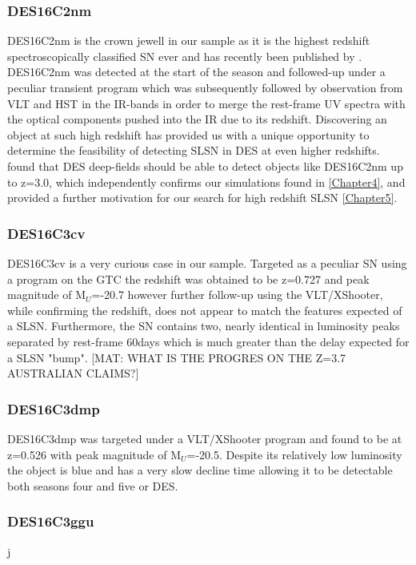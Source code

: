 \subsubsection{DES16C2nm}
DES16C2nm is the crown jewell in our sample as it is the highest redshift spectroscopically classified SN ever and has recently been published by \citet{Smith2018}. DES16C2nm was detected at the start of the season and followed-up under a peculiar transient program which was subsequently followed by observation from VLT and HST in the IR-bands in order to merge the rest-frame UV spectra with the optical components pushed into the IR due to its redshift. Discovering an object at such high redshift has provided us with a unique opportunity to determine the feasibility of detecting SLSN in DES at even higher redshifts. \citet{Smith2018} found that DES deep-fields should be able to detect objects like DES16C2nm up to z=3.0, which independently confirms our simulations found in \cref{Chapter4}, and provided a further motivation for our search for high redshift SLSN \cref{Chapter5}.

\subsubsection{DES16C3cv}
DES16C3cv is a very curious case in our sample. Targeted as a peculiar SN using a program on the GTC the redshift was obtained to be z=0.727 and peak magnitude of M$_U$=-20.7 however further follow-up using the VLT/XShooter, while confirming the redshift, does not appear to match the features expected of a SLSN. Furthermore, the SN contains two, nearly identical in luminosity peaks separated by rest-frame 60days which is much greater than the delay expected for a SLSN "bump". [MAT: WHAT IS THE PROGRES ON THE Z=3.7 AUSTRALIAN CLAIMS?]

\subsubsection{DES16C3dmp}
DES16C3dmp was targeted under a VLT/XShooter program and found to be at z=0.526 with peak magnitude of M$_U$=-20.5. Despite its relatively low luminosity the object is blue and has a very slow decline time allowing it to be detectable both seasons four and five or DES.  

\subsubsection{DES16C3ggu}
j

